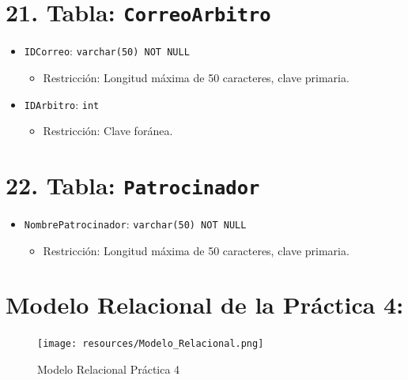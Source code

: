 \section*{21. Tabla: \texttt{CorreoArbitro}}
\begin{itemize}
    \item \texttt{IDCorreo}: \texttt{varchar(50) NOT NULL}
    \begin{itemize}
        \item Restricción: Longitud máxima de 50 caracteres, clave primaria.
    \end{itemize}
    \item \texttt{IDArbitro}: \texttt{int}
    \begin{itemize}
        \item Restricción: Clave foránea.
    \end{itemize}
\end{itemize}

\section*{22. Tabla: \texttt{Patrocinador}}
\begin{itemize}
    \item \texttt{NombrePatrocinador}: \texttt{varchar(50) NOT NULL}
    \begin{itemize}
        \item Restricción: Longitud máxima de 50 caracteres, clave primaria.
    \end{itemize}
\end{itemize}


\section{Modelo Relacional de la Práctica 4:}
\begin{figure}[h]
    \centering
    \texttt{[image: resources/Modelo\_Relacional.png]}
    \caption{Modelo Relacional Práctica 4}
\end{figure}

\clearpage

